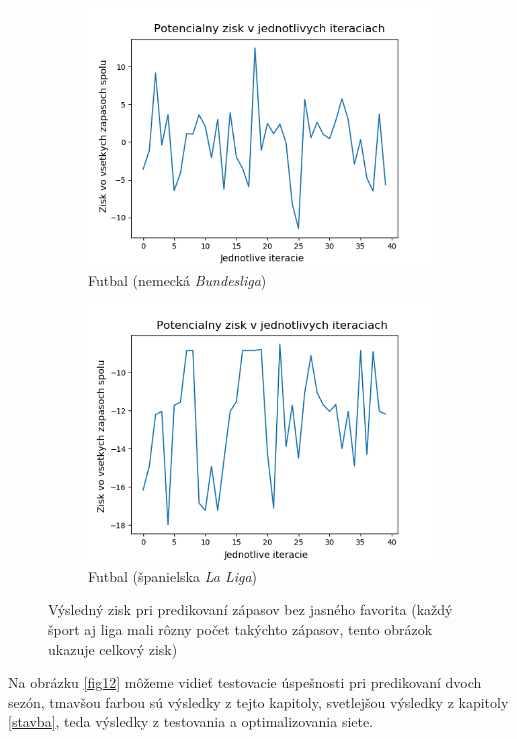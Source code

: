 \begin{figure}[h!]
\begin{subfigure}[b]{0.48\textwidth}
    \includegraphics[width=\textwidth]{../img/rnn_ger_prof.png} 
    \caption{Futbal (nemecká \textit{Bundesliga})} 
  \end{subfigure}
  \hfill
  \begin{subfigure}[b]{0.48\textwidth}
    \includegraphics[width=\textwidth]{../img/rnn_spa_prof.png} 
    \caption{Futbal (španielska \textit{La Liga})} 
  \end{subfigure}
  \caption{Výsledný zisk pri predikovaní zápasov bez jasného favorita (každý šport aj liga mali rôzny počet takýchto zápasov, tento obrázok ukazuje celkový zisk)}
   \label{fig11}  
\end{figure}

Na obrázku \ref{fig12} môžeme vidieť testovacie úspešnosti pri pre\-dikovaní dvoch sezón, tmavšou farbou sú výsledky z tejto kapitoly, svetlejšou výsledky z kapitoly \ref{stavba}, teda výsledky z testovania a optimalizovania siete.

